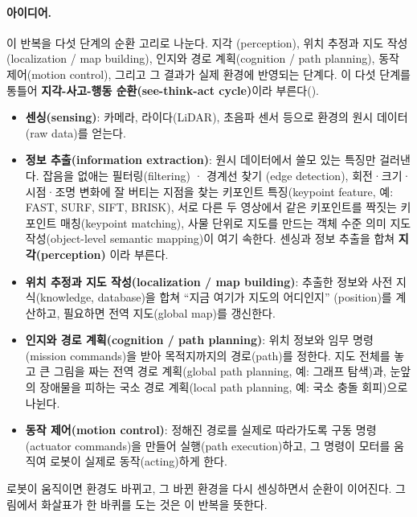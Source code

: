 \paragraph{아이디어.} 이 반복을 다섯 단계의 순환 고리로 나눈다. 지각
(perception), 위치 추정과 지도 작성(localization / map building), 인지와 경로
계획(cognition / path planning), 동작 제어(motion control), 그리고 그 결과가
실제 환경에 반영되는 단계다. 이 다섯 단계를 통틀어 \textbf{지각-사고-행동
순환(see-think-act cycle)}이라 부른다().

\begin{itemize}
  \item \textbf{센싱(sensing)}: 카메라, 라이다(LiDAR), 초음파 센서 등으로
    환경의 원시 데이터(raw data)를 얻는다.
  \item \textbf{정보 추출(information extraction)}: 원시 데이터에서 쓸모
    있는 특징만 걸러낸다. 잡음을 없애는 필터링(filtering) · 경계선 찾기
    (edge detection), 회전·크기·시점·조명 변화에 잘 버티는 지점을 찾는
    키포인트 특징(keypoint feature, 예: FAST, SURF, SIFT, BRISK), 서로 다른
    두 영상에서 같은 키포인트를 짝짓는 키포인트 매칭(keypoint matching),
    사물 단위로 지도를 만드는 객체 수준 의미 지도 작성(object-level semantic
    mapping)이 여기 속한다. 센싱과 정보 추출을 합쳐 \textbf{지각(perception)}
    이라 부른다. %
  \item \textbf{위치 추정과 지도 작성(localization / map building)}: 추출한
    정보와 사전 지식(knowledge, database)을 합쳐 ``지금 여기가 지도의 어디인지''
    (position)를 계산하고, 필요하면 전역 지도(global map)를 갱신한다.
  \item \textbf{인지와 경로 계획(cognition / path planning)}: 위치 정보와
    임무 명령(mission commands)을 받아 목적지까지의 경로(path)를 정한다. 지도
    전체를 놓고 큰 그림을 짜는 전역 경로 계획(global path planning, 예: 그래프
    탐색)과, 눈앞의 장애물을 피하는 국소 경로 계획(local path planning, 예:
    국소 충돌 회피)으로 나뉜다. %
  \item \textbf{동작 제어(motion control)}: 정해진 경로를 실제로 따라가도록
    구동 명령(actuator commands)을 만들어 실행(path execution)하고, 그 명령이
    모터를 움직여 로봇이 실제로 동작(acting)하게 한다. %
\end{itemize}

로봇이 움직이면 환경도 바뀌고, 그 바뀐 환경을 다시 센싱하면서 순환이 이어진다.
그림에서 화살표가 한 바퀴를 도는 것은 이 반복을 뜻한다.

